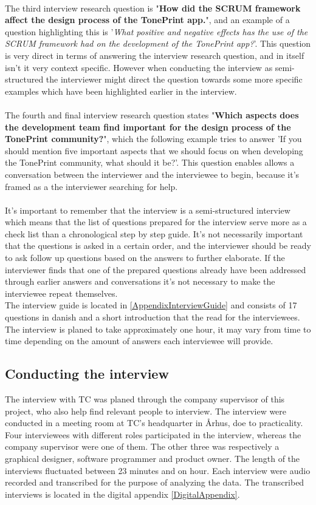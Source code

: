 \\
The third interview research question is "\textbf{How did the SCRUM framework affect the design process of the TonePrint app.}", and an example of a question highlighting this is '\textit{What positive and negative effects has the use of the SCRUM framework had on the development of the TonePrint app?}'. This question is very direct in terms of answering the interview research question, and in itself isn't it very context specific. However when conducting the interview as semi-structured the interviewer might direct the question towards some more specific examples which have been highlighted earlier in the interview.\\
\\
The fourth and final interview research question states "\textbf{Which aspects does the development team find important for the design process of the TonePrint community?}", which the following example tries to answer 'If you should mention five important aspects that we should focus on when developing the TonePrint community, what should it be?'. This question enables allows a conversation between the interviewer and the interviewee to begin, because it's framed as a the interviewer searching for help.\\
\\
It's important to remember that the interview is a semi-structured interview which means that the list of questions prepared for the interview serve more as a check list than a chronological step by step guide. It's not necessarily important that the questions is asked in a certain order, and the interviewer should be ready to ask follow up questions based on the answers to further elaborate. If the interviewer finds that one of the prepared questions already have been addressed through earlier answers and conversations it's not necessary to make the interviewee repeat themselves. \\
The interview guide is located in \autoref{AppendixInterviewGuide} and consists of 17 questions in danish and a short introduction that the read for the interviewees. The interview is planed to take approximately one hour, it may vary from time to time depending on the amount of answers each interviewee will provide.

\subsection{Conducting the interview}
\label{ConductingInterview}
%
The interview with TC was planed through the company supervisor of this project, who also help find relevant people to interview. The interview were conducted in a meeting room at TC's headquarter in Århus, doe to practicality.\\
Four interviewees with different roles participated in the interview, whereas the company supervisor were one of them. The other three was respectively a graphical designer, software programmer and product owner. The length of the interviews fluctuated between 23 minutes and on hour. Each interview were audio recorded and transcribed for the purpose of analyzing the data. The transcribed interviews is located in the digital appendix \autoref{DigitalAppendix}.\\


